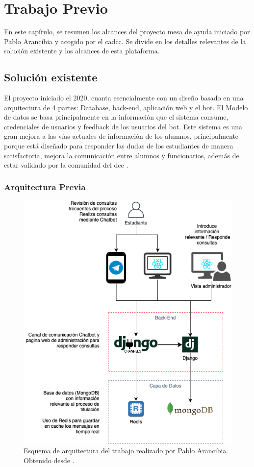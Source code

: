 \chapter{Trabajo Previo}
 En este capítulo, se resumen los alcances del proyecto mesa de ayuda iniciado por Pablo Arancibia y acogido por el \acrshort{cadcc}. Se divide en los detalles relevantes de la solución existente y los alcances de esta plataforma.

\section{Solución existente}
    El proyecto iniciado el 2020, cuanta esencialmente con un diseño basado en una arquitectura de 4 partes: Database, back-end, aplicación web y el bot. El Modelo de datos se basa principalmente en la información que el sistema consume, credenciales de usuarios y feedback de los usuarios del bot. Este sistema es una gran mejora a las vías actuales de información de los alumnos, principalmente porque está diseñado para responder las dudas de los estudiantes de manera satisfactoria, mejora la comunicación entre alumnos y funcionarios, además de estar validado por la comunidad del \acrshort{dcc} \cite{ARANCIBIA2021}.

    \subsection{Arquitectura Previa}
        \begin{figure}[h]
            \centering
            \includegraphics[scale=0.5]{media/imagenes/trabajo_previo/arquitectura_del_sistema.png}
            \caption[Arquitectura sistema anterior]{Esquema de arquitectura del trabajo realizado por Pablo Arancibia. Obtenido desde \cite{ARANCIBIA2021}.}
            \label{fig:arc-previa}
        \end{figure}

